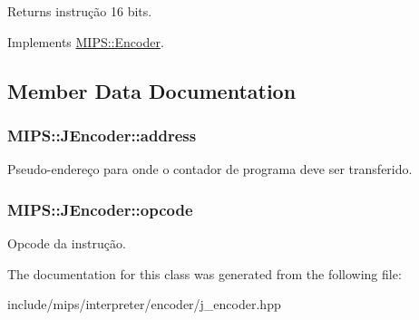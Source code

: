 \begin{DoxyReturn}{Returns}
instrução 16 bits. 
\end{DoxyReturn}


Implements \hyperlink{classMIPS_1_1Encoder_ac3ea6ce91eabd41b3c512a39ee4c3550}{M\+I\+P\+S\+::\+Encoder}.



\subsection{Member Data Documentation}
\subsubsection[{\texorpdfstring{address}{address}}]{ M\+I\+P\+S\+::\+J\+Encoder\+::address\hspace{0.3cm}{\ttfamily [protected]}}\hypertarget{classMIPS_1_1JEncoder_a912e11de3756d2d4cb33cbdceb29b021}{}\label{classMIPS_1_1JEncoder_a912e11de3756d2d4cb33cbdceb29b021}
Pseudo-\/endereço para onde o contador de programa deve ser transferido. 
\subsubsection[{\texorpdfstring{opcode}{opcode}}]{ M\+I\+P\+S\+::\+J\+Encoder\+::opcode\hspace{0.3cm}{\ttfamily [protected]}}\hypertarget{classMIPS_1_1JEncoder_a7c8a1750a88644f955501b841ea29490}{}\label{classMIPS_1_1JEncoder_a7c8a1750a88644f955501b841ea29490}
Opcode da instrução. 

The documentation for this class was generated from the following file\+:\begin{DoxyCompactItemize}
\item 
include/mips/interpreter/encoder/j\+\_\+encoder.\+hpp\end{DoxyCompactItemize}
